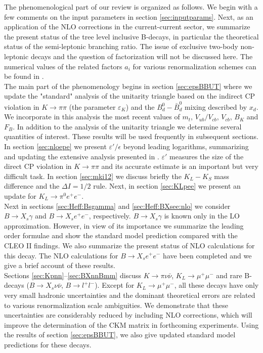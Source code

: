 The phenomenological part of our review is organized as follows.  We
begin with a few comments on the input parameters in section
\ref{sec:inputparams}. Next, as an application of the NLO corrections
in the current-current sector, we summarize the present status of the
tree level inclusive B-decays, in particular the theoretical status of
the semi-leptonic branching ratio.  The issue of exclusive two-body
non-leptonic decays and the question of factorization will not be
discussed here. The numerical values of the related factors $a_i$ for
various renormalization schemes can be found in \cite{buras:94}.
\\
The main part of the phenomenology begins in section \ref{sec:epsBBUT}
where we update the "standard" analysis of the unitarity triangle based
on the indirect CP violation in $K\to\pi\pi$ (the parameter
$\varepsilon_K$) and the $B^0_d-\bar B^0_d$ mixing described by $x_d$.
We incorporate in this analysis the most recent values of $m_t$,
$V_{ub}/V_{cb}$, $V_{cb}$, $B_K$ and $F_B$.  In addition to the
analysis of the unitarity triangle we determine several quantities of
interest. These results will be used frequently in subsequent sections.
\\
In section \ref{sec:nloepe} we present $\varepsilon'/\epsilon$ beyond
leading logarithms, summarizing and updating the extensive analysis
presented in \cite{burasetal:92d}. $\varepsilon'$ measures the size of
the direct CP violation in $K\to \pi\pi$ and its accurate estimate is
an important but very difficult task. In section \ref{sec:mki12} we
discuss briefly the $K_L-K_S$ mass difference and the $\Delta I=1/2$
rule. Next, in section \ref{sec:KLpee} we present an update for 
$K_L\to\pi^0 e^+e^-$.
\\
Next in sections \ref{sec:Heff:Bsgamma} and \ref{sec:Heff:BXsee:nlo} we
consider $B\to X_s\gamma$ and $B\to X_s e^+e^-$, respectively.  $B\to
X_s\gamma$ is known only in the LO approximation. However, in view of
its importance we summarize the leading order formulae and show the
standard model prediction compared with the CLEO II findings. We also
summarize the present status of NLO calculations for this decay. The
NLO calculations for $B\to X_s e^+ e^-$ have been completed and we give
a brief account of these results.
\\
Sections \ref{sec:Kpnn}--\ref{sec:BXnnBmm} discuss  $K\to
\pi\nu\bar\nu$, $K_L\to \mu^+\mu^-$ and rare B-decays ($B\to
X_s\nu\bar\nu$, $B\to l^+l^-$).  Except for $K_L\to \mu^+\mu^-$, all
these decays have only very small hadronic uncertainties and the
dominant theoretical errors are related to various renormalization
scale ambiguities. We demonstrate that these uncertainties are
considerably reduced by including NLO corrections, which will improve
the determination of the CKM matrix in forthcoming experiments. Using
the results of section \ref{sec:epsBBUT}, we also give updated standard
model predictions for these decays.
